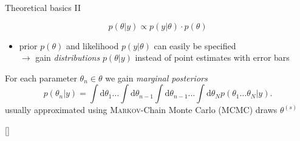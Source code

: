 \documentclass[11pt,aspectratio=169,dvipsnames]{beamer}
\newcommand{\thecolor}{black!70!blue}
\begin{document}
\begin{frame}{Theoretical basics II}
			\addtocounter{framenumber}{-1}
	$$p(\theta|y)\propto p(y|\theta)\cdot p(\theta)$$
		\begin{itemize}
			\item prior $p(\theta)$ and likelihood $p(y|\theta)$ can easily be specified \\
			$\to$ gain \emph{distributions} $p(\theta|y)$ instead of point estimates with error bars
		\end{itemize}
		\begin{tcolorbox}[colback=blue!5,colframe=\thecolor,title=\textsc{Bayesian} parameter inference]
			For each parameter $\theta_n\in\theta$ we gain \emph{marginal posteriors}
			\begin{equation*}
				\label{eq:marpost}
				p(\theta_n|y)=\int\text{d}\theta_1\dots\int\text{d}\theta_{n-1}\int\text{d}\theta_{n-1}\dots\int\text{d}\theta_Np(\theta_1\dots\theta_N|y).
			\end{equation*}
		usually approximated using \textsc{Markov}-Chain Monte Carlo (MCMC) draws $\theta^{(s)}$
			\begin{flushright}
				{\scriptsize[\cite{sivia}]}
			\end{flushright}
		\end{tcolorbox}
	\end{frame}
\end{document}
